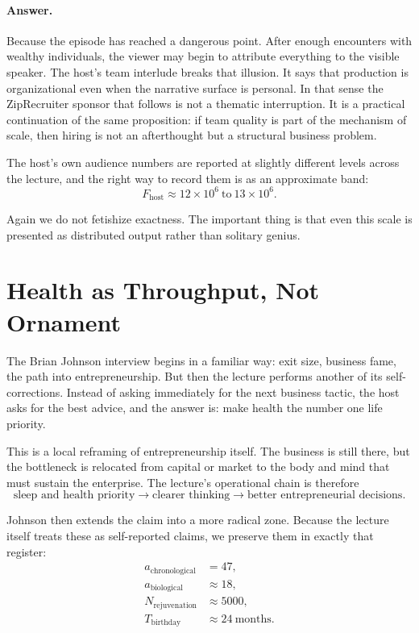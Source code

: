 \paragraph{Answer.} Because the episode has reached a dangerous point. After enough encounters with wealthy individuals, the viewer may begin to attribute everything to the visible speaker. The host's team interlude breaks that illusion. It says that production is organizational even when the narrative surface is personal. In that sense the ZipRecruiter sponsor that follows is not a thematic interruption. It is a practical continuation of the same proposition: if team quality is part of the mechanism of scale, then hiring is not an afterthought but a structural business problem.

The host's own audience numbers are reported at slightly different levels across the lecture, and the right way to record them is as an approximate band:
\begin{equation}
F_{\mathrm{host}} \approx 12\times 10^{6}\ \text{to}\ 13\times 10^{6}.
\end{equation}

Again we do not fetishize exactness. The important thing is that even this scale is presented as distributed output rather than solitary genius.

\section{Health as Throughput, Not Ornament}

The Brian Johnson interview begins in a familiar way: exit size, business fame, the path into entrepreneurship. But then the lecture performs another of its self-corrections. Instead of asking immediately for the next business tactic, the host asks for the best advice, and the answer is: make health the number one life priority.

This is a local reframing of entrepreneurship itself. The business is still there, but the bottleneck is relocated from capital or market to the body and mind that must sustain the enterprise. The lecture's operational chain is therefore
\begin{equation}
\text{sleep and health priority}
\to
\text{clearer thinking}
\to
\text{better entrepreneurial decisions}.
\end{equation}

Johnson then extends the claim into a more radical zone. Because the lecture itself treats these as self-reported claims, we preserve them in exactly that register:
\begin{align}
a_{\mathrm{chronological}} &= 47,\\
a_{\mathrm{biological}} &\approx 18,\\
N_{\mathrm{rejuvenation}} &\approx 5000,\\
T_{\mathrm{birthday}} &\approx 24\ \text{months}.
\end{align}

